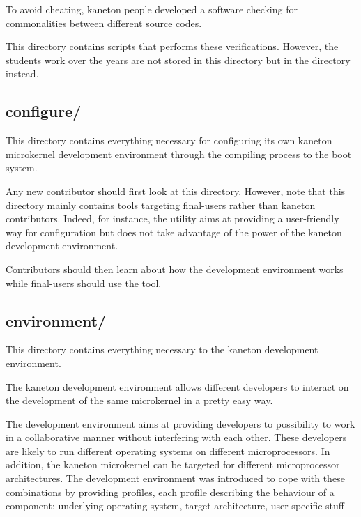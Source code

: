 To avoid cheating, kaneton people developed a software checking for
commonalities between different source codes.

This directory contains scripts that performs these verifications. However,
the students work over the years are not stored in this directory but in
the  directory instead.

%
%

\subsection*{configure/}

This directory contains everything necessary for configuring its own
kaneton microkernel development environment through the compiling process
to the boot system.

Any new contributor should first look at this directory. However, note that
this directory mainly contains tools targeting final-users rather than
kaneton contributors. Indeed, for instance, the  utility
aims at providing a user-friendly way for configuration but does not take
advantage of the power of the kaneton development environment.

Contributors should then learn about how the development environment works
while final-users should use the  tool.

%
%

\subsection*{environment/}

This directory contains everything necessary to the kaneton development
environment.

The kaneton development environment allows different developers to
interact on the development of the same microkernel in a pretty easy way.

The development environment aims at providing developers to possibility to
work in a collaborative manner without interfering with each other. These
developers are likely to run different operating systems on different
microprocessors. In addition, the kaneton microkernel can be targeted for
different microprocessor architectures. The development environment was
introduced to cope with these combinations by providing profiles, each
profile describing the behaviour of a component: underlying operating system,
target architecture, user-specific stuff \etc{}


